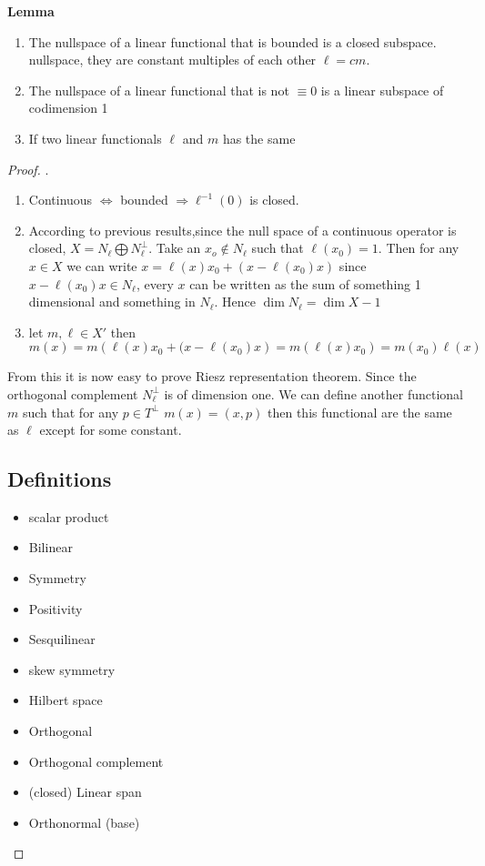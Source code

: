 \documentclass[titlepage]{article}
\begin{document}
\textbf{Lemma}
\begin{enumerate}
\item The nullspace of a linear functional that is bounded is a closed subspace.
nullspace, they are constant multiples of each other $\ell = cm$.
\item The nullspace of a linear functional that is not $\equiv 0$ is a linear subspace of codimension 1
\item If two linear functionals $\ell$ and $m$ has the same 
\end{enumerate}
\begin{proof}
.

\begin{enumerate}
\item  Continuous $\Longleftrightarrow$ bounded $\Longrightarrow \ell ^{-1}(0)$ is closed.
\item According to previous results,since the null space of a continuous operator is closed, $X = N_\ell\bigoplus N_\ell^\perp$.
Take an $x_o\not\in N_\ell$ such that $\ell(x_0) = 1$.
Then for any $x\in X$ we can write $x = \ell(x)x_0 + (x - \ell(x_0)x)$
since $x - \ell(x_0)x \in  N_\ell$, every $x$ can be written as the sum of something 1 dimensional and something in $N_\ell$. Hence $\dim N_\ell = \dim X - 1$ 

\item let $m,\ell \in X'$ then $m(x) = m\left(\ell(x)x_0 + (x - \ell(x_0)x\right) = m(\ell(x)x_0) = m(x_0)\ell(x)$


\end{enumerate}
From this it is now easy to prove Riesz representation theorem.
Since the orthogonal complement $N_\ell^\perp$ is of dimension one. We can define another functional $m$ such that for any  $p \in T^\perp$ $m(x) = (x,p)$ then this functional are the same as $\ell$ except for some constant.
\subsection{Definitions}
\begin{itemize}
\item scalar product
\item Bilinear
\item Symmetry 
\item Positivity
\item Sesquilinear
\item skew symmetry
\item Hilbert space
\item Orthogonal
\item Orthogonal complement
\item (closed) Linear span
\item Orthonormal (base)
\end{itemize}



\end{proof}
\end{document}
